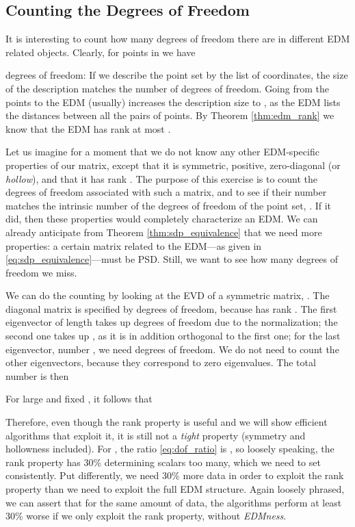 \documentclass[10pt,double]{IEEEtran}
\newcommand{\rev}[1]{{#1}}
\begin{document}
\subsection{Counting the Degrees of Freedom}

It is interesting to count how many degrees of freedom there are in different
EDM related objects. Clearly, for  points in  we have

degrees of freedom: If we describe the point set by the list of coordinates,
the size of the description matches the number of degrees of freedom. Going
from the points to the EDM (usually) increases the description size to
, as the EDM lists the distances between all the pairs of
points. 
By Theorem \ref{thm:edm_rank} we know that the EDM has
rank at most .

\rev{Let us imagine for a moment that we do not know any other EDM-specific
properties of our matrix, except that it is symmetric, positive, zero-diagonal
(or \emph{hollow}), and that it has rank . The purpose of this exercise
is to count the degrees of freedom associated with such a matrix, and to see
if their number matches the intrinsic number of the degrees of freedom of the
point set, . If it did, then these properties would completely
characterize an EDM. We can already anticipate from Theorem
\ref{thm:sdp_equivalence} that we need more properties: a certain matrix related to the
EDM---as given in \eqref{eq:sdp_equivalence}---must be PSD. Still, we want to
see how many degrees of freedom we miss.

We can do the counting by looking at the EVD of a symmetric matrix, . The diagonal matrix  is specified by  degrees
of freedom, because  has rank . The first eigenvector of length 
takes up  degrees of freedom due to the normalization; the second one
takes up , as it is in addition orthogonal to the first one; for the last
eigenvector, number , we need  degrees of freedom. We do not
need to count the other eigenvectors, because they correspond to zero
eigenvalues. The total number is then


}

For large  and fixed , it follows that

Therefore, even though the rank property is useful and we will show efficient
algorithms that exploit it, it is still not a \emph{tight} property (symmetry
and hollowness included). For , the ratio
\eqref{eq:dof_ratio} is , so loosely speaking, the rank property
has 30\% determining scalars too many, which we need to set consistently.
Put differently, we need 30\% more data in order to exploit the rank property
than we need to exploit the full EDM structure. Again loosely phrased, we can
assert that for the same amount of data, the algorithms perform at least
30\% worse if we only exploit the rank property, without
\emph{EDMness}.
\end{document}
